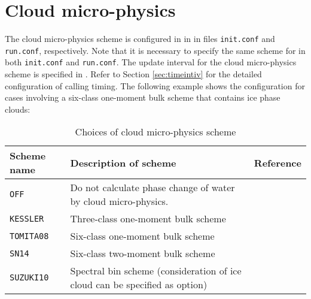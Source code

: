 
\section{Cloud micro-physics} \label{sec:basic_usel_microphys}
The cloud micro-physics scheme is configured in  in  in files \verb|init.conf| and \verb|run.conf|, respectively.
{\color{blue} Note that it is necessary to specify the same scheme for  in both \texttt{init.conf} and \texttt{run.conf}}.
The update interval for the cloud micro-physics scheme is specified in . Refer to Section \ref{sec:timeintiv} for the detailed configuration of calling timing. The following example shows the configuration for cases involving a six-class one-moment bulk scheme that contains ice phase clouds:


\begin{table}[tbh]
\begin{center}
  \caption{Choices of cloud micro-physics scheme}
  \label{tab:nml_atm_mp}
  \begin{tabularx}{150mm}{lXX} \hline
    \rowcolor[gray]{0.9}  Scheme name & Description of scheme & Reference\\ \hline
     \verb|OFF|      & Do not calculate phase change of water by cloud micro-physics. &  \\
     \verb|KESSLER|  & Three-class one-moment bulk scheme & \citet{kessler_1969} \\
     \verb|TOMITA08| & Six-class one-moment bulk scheme & \citet{tomita_2008} \\
     \verb|SN14|     & Six-class two-moment bulk scheme & \citet{sn_2014} \\
     \verb|SUZUKI10| & Spectral bin scheme (consideration of ice cloud can be specified as option) & \citet{suzuki_etal_2010} \\
    \hline
  \end{tabularx}
\end{center}
\end{table}

